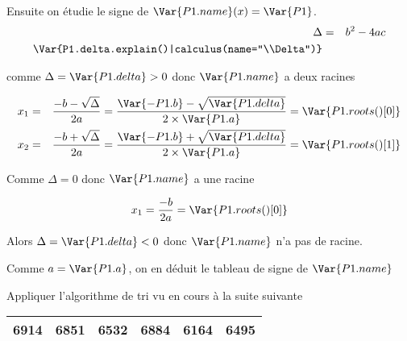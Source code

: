 \documentclass[a4paper,10pt, table]{/media/documents/Cours/Prof/Enseignements/tools/style/classDS}
\begin{document}
\begin{questions}
\begin{parts}
\begin{solution}
            Ensuite on étudie le signe de $\Var{P1.name}(x) = \Var{P1}$.
        \begin{eqnarray*}
            \Delta & = & b^2-4ac \\
            \Var{P1.delta.explain()|calculus(name="\\Delta")}
        \end{eqnarray*}

            comme $\Delta = \Var{P1.delta} > 0$ donc $\Var{P1.name}$ a deux racines

            \begin{eqnarray*}
                x_1 & = & \frac{-b - \sqrt{\Delta}}{2a} =  \frac{\Var{-P1.b} - \sqrt{\Var{P1.delta}}}{2 \times \Var{P1.a}} = \Var{P1.roots()[0] } \\
                x_2 & = & \frac{-b + \sqrt{\Delta}}{2a} =  \frac{\Var{-P1.b} + \sqrt{\Var{P1.delta}}}{2 \times \Var{P1.a}} = \Var{P1.roots()[1] }
            \end{eqnarray*}


            Comme $\Delta = 0$ donc $\Var{P1.name}$ a une racine

            \begin{eqnarray*}
                x_1 = \frac{-b}{2a} = \Var{P1.roots()[0]} \\
            \end{eqnarray*}


        Alors $\Delta = \Var{P1.delta} < 0$ donc $\Var{P1.name}$ n'a pas de racine.

        Comme $a = \Var{P1.a}$, on en déduit le tableau de signe de $\Var{P1.name}$
            \begin{center}
            \end{center}

        \end{solution}
    \end{parts}

    \question
    Appliquer l'algorithme de tri vu en cours à la suite suivante
    \begin{center}
    \begin{tabular}{|*{6}{c|}}
        \hline
        6914 & 6851 & 6532 & 6884 & 6164 & 6495 \\
        \hline
    \end{tabular}
        
    \end{center}


\end{questions}
    
\end{document}
